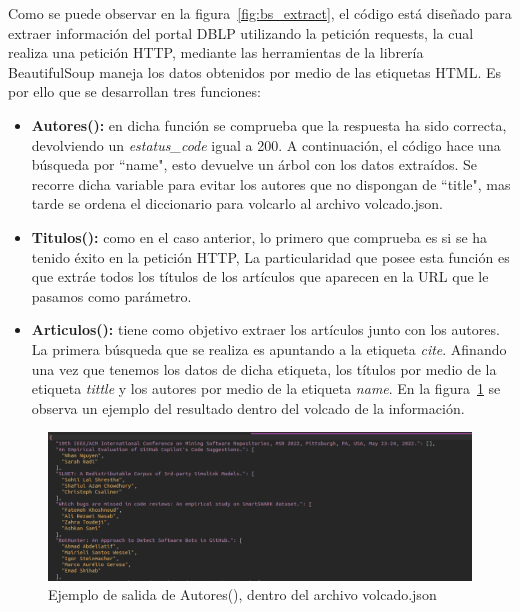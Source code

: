 \documentclass[a4paper, 12pt]{book}
\begin{document}
Como se puede observar en la figura~\ref{fig:bs_extract}, el código está diseñado para extraer información del portal DBLP utilizando la petición requests, la cual realiza una petición HTTP, mediante las herramientas de la librería BeautifulSoup maneja los datos obtenidos por medio de  las etiquetas HTML. Es por ello que se desarrollan tres funciones:

\begin{itemize}
    \item \textbf{Autores():}
    en dicha función se comprueba que la respuesta ha sido correcta, devolviendo un \textit{estatus\_code} igual a 200. A continuación, el código hace una búsqueda por ``name", esto devuelve un árbol con los datos extraídos.
    Se recorre dicha variable para evitar los autores que no dispongan de ``title", mas tarde se ordena el diccionario para volcarlo al archivo volcado.json.
    \item \textbf{Titulos():}
    como en el caso anterior, lo primero que comprueba es si se ha tenido éxito en la petición HTTP, La particularidad que posee esta función es que extráe todos los títulos de los artículos que aparecen en la URL que le pasamos como parámetro.
    \item \textbf{Articulos():}
    tiene como objetivo extraer los artículos junto con los autores. La primera búsqueda que se realiza es apuntando a la etiqueta \textit{cite}. Afinando una vez que tenemos los datos de dicha etiqueta, los títulos por medio de la etiqueta \textit{tittle} y los autores por medio de la etiqueta \textit{name}. En la figura~\ref{fig:bs_ej} se observa un ejemplo del resultado dentro del volcado de la información.
\end{itemize}

\begin{figure}[h]
  \centering
  \includegraphics[width=16cm, keepaspectratio]{img/ej_salida_BS.png}
  \caption{Ejemplo de salida de Autores(), dentro del archivo volcado.json}
  \label{fig:bs_ej}
\end{figure}
\end{document}
